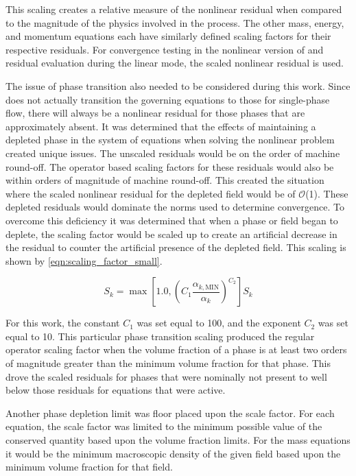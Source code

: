 This scaling creates a relative measure of the nonlinear residual when compared to the magnitude of the physics involved in the process.
The other mass, energy, and momentum equations each have similarly defined scaling factors for their respective residuals.
For convergence testing in the nonlinear version of \cobra{} and residual evaluation during the linear mode, the scaled nonlinear residual is used.

The issue of phase transition also needed to be considered during this work.
Since \cobra{} does not actually transition the governing equations to those for single-phase flow, there will always be a nonlinear residual for those phases that are approximately absent.
It was determined that the effects of maintaining a depleted phase in the system of equations when solving the nonlinear problem created unique issues.
The unscaled residuals would be on the order of machine round-off.
The operator based scaling factors for these residuals would also be within orders of magnitude of machine round-off.
This created the situation where the scaled nonlinear residual for the depleted field would be of $\mathcal{O}$(1).
These depleted residuals would dominate the norms used to determine convergence.
To overcome this deficiency it was determined that when a phase or field began to deplete, the scaling factor would be scaled up to create an artificial decrease in the residual to counter the artificial presence of the depleted field.
This scaling is shown by \eqref{eqn:scaling_factor_small}.

\begin{equation}
\label{eqn:scaling_factor_small}
S_k = \max[1.0, \left(C_1 \frac{\alpha_{k,\text{MIN}}}{\alpha_k}\right)^{C_2} ] S_k
\end{equation}

For this work, the constant $C_1$ was set equal to 100, and the exponent $C_2$ was set equal to 10.
This particular phase transition scaling produced the regular operator scaling factor when the volume fraction of a phase is at least two orders of magnitude greater than the minimum volume fraction for that phase.
This drove the scaled residuals for phases that were nominally not present to well below those residuals for equations that were active.

Another phase depletion limit was floor placed upon the scale factor.
For each equation, the scale factor was limited to the minimum possible value of the conserved quantity based upon the volume fraction limits.
For the mass equations it would be the minimum macroscopic density of the given field based upon the minimum volume fraction for that field.


